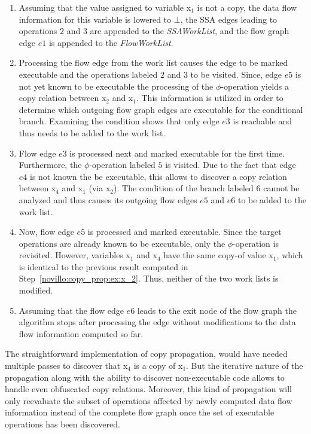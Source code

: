 \begin{enumerate}
\item Assuming that the value assigned to variable x$_1$ is not a copy, the data
      flow information for this variable is lowered to $\bot$, the SSA edges
      leading to operations $2$ and $3$ are appended to the \emph{SSAWorkList},
      and the flow graph edge $e1$ is appended to the \emph{FlowWorkList}.
\item \label{novillo:copy_prop:ex:x_2} Processing the flow edge from the
      work list causes the edge to be marked executable and the operations
      labeled $2$ and $3$ to be visited. Since, edge $e5$ is not yet known to be
      executable the processing of the $\phi$-operation yields a copy relation
      between x$_2$ and x$_1$. This information is utilized in order to
      determine which outgoing flow graph edges are executable for the
      conditional branch. Examining the condition shows that only edge $e3$ is
      reachable and thus needs to be added to the work list.
\item Flow edge $e3$ is processed next and marked executable for the first time.
      Furthermore, the $\phi$-operation labeled $5$ is visited. Due to the fact
      that edge $e4$ is not known the be executable, this allows to discover a
      copy relation between x$_4$ and x$_1$ (via x$_2$). The condition of the
      branch labeled $6$ cannot be analyzed and thus causes its outgoing flow
      edges $e5$ and $e6$ to be added to the work list.
\item Now, flow edge $e5$ is processed and marked executable. Since the target
      operations are already known to be executable, only the $\phi$-operation
      is revisited. However, variables x$_1$ and x$_4$ have the same copy-of
      value x$_1$, which is identical to the previous result computed in
      Step~\ref{novillo:copy_prop:ex:x_2}. Thus, neither of the two work lists
      is modified.
\item Assuming that the flow edge $e6$ leads to the exit node of the flow graph
      the algorithm stops after processing the edge without modifications to
      the data flow information computed so far.
\end{enumerate}

The straightforward implementation of copy propagation, would have needed
multiple passes to discover that x$_4$ is a copy of x$_1$.  But the iterative
nature of the propagation along with the ability to discover non-executable
code allows to handle even obfuscated copy relations. Moreover, this kind of
propagation will only reevaluate the subset of operations affected by newly
computed data flow information instead of the complete flow graph once the set
of executable operations has been discovered.

